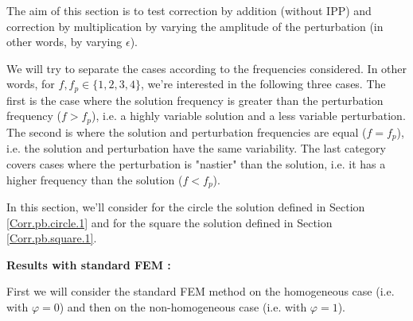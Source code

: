 The aim of this section is to test correction by addition (without IPP) and correction by multiplication by varying the amplitude of the perturbation (in other words, by varying $\epsilon$). 

We will try to separate the cases according to the frequencies considered. In other words, for $f,f_p\in\{1,2,3,4\}$, we're interested in the following three cases. The first is the case where the solution frequency is greater than the perturbation frequency ($f>f_p$), i.e. a highly variable solution and a less variable perturbation. The second is where the solution and perturbation frequencies are equal ($f=f_p$), i.e. the solution and perturbation have the same variability. The last category covers cases where the perturbation is "nastier" than the solution, i.e. it has a higher frequency than the solution ($f<f_p$). 

In this section, we'll consider for the circle the solution defined in Section \ref{Corr.pb.circle.1} and for the square the solution defined in Section \ref{Corr.pb.square.1}.

\textbf{Results with standard FEM :}

First we will consider the standard FEM method on the homogeneous case (i.e. with $\varphi=0$) and then on the non-homogeneous case (i.e. with $\varphi=1$).

